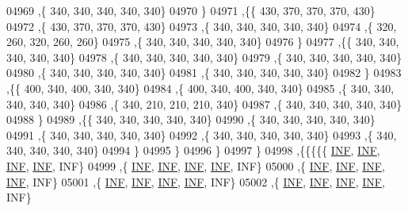 \begin{DoxyCode}
04969     ,\{   340,   340,   340,   340,   340\}
04970     \}
04971    ,\{\{   430,   370,   370,   370,   430\}
04972     ,\{   430,   370,   370,   370,   430\}
04973     ,\{   340,   340,   340,   340,   340\}
04974     ,\{   320,   260,   320,   260,   260\}
04975     ,\{   340,   340,   340,   340,   340\}
04976     \}
04977    ,\{\{   340,   340,   340,   340,   340\}
04978     ,\{   340,   340,   340,   340,   340\}
04979     ,\{   340,   340,   340,   340,   340\}
04980     ,\{   340,   340,   340,   340,   340\}
04981     ,\{   340,   340,   340,   340,   340\}
04982     \}
04983    ,\{\{   400,   340,   400,   340,   340\}
04984     ,\{   400,   340,   400,   340,   340\}
04985     ,\{   340,   340,   340,   340,   340\}
04986     ,\{   340,   210,   210,   210,   340\}
04987     ,\{   340,   340,   340,   340,   340\}
04988     \}
04989    ,\{\{   340,   340,   340,   340,   340\}
04990     ,\{   340,   340,   340,   340,   340\}
04991     ,\{   340,   340,   340,   340,   340\}
04992     ,\{   340,   340,   340,   340,   340\}
04993     ,\{   340,   340,   340,   340,   340\}
04994     \}
04995    \}
04996   \}
04997  \}
04998 ,\{\{\{\{\{   \hyperlink{constants_8h_a12c2040f25d8e3a7b9e1c2024c618cb6}{INF},   \hyperlink{constants_8h_a12c2040f25d8e3a7b9e1c2024c618cb6}{INF},   \hyperlink{constants_8h_a12c2040f25d8e3a7b9e1c2024c618cb6}{INF},   \hyperlink{constants_8h_a12c2040f25d8e3a7b9e1c2024c618cb6}{INF},   INF\}
04999     ,\{   \hyperlink{constants_8h_a12c2040f25d8e3a7b9e1c2024c618cb6}{INF},   \hyperlink{constants_8h_a12c2040f25d8e3a7b9e1c2024c618cb6}{INF},   \hyperlink{constants_8h_a12c2040f25d8e3a7b9e1c2024c618cb6}{INF},   \hyperlink{constants_8h_a12c2040f25d8e3a7b9e1c2024c618cb6}{INF},   INF\}
05000     ,\{   \hyperlink{constants_8h_a12c2040f25d8e3a7b9e1c2024c618cb6}{INF},   \hyperlink{constants_8h_a12c2040f25d8e3a7b9e1c2024c618cb6}{INF},   \hyperlink{constants_8h_a12c2040f25d8e3a7b9e1c2024c618cb6}{INF},   \hyperlink{constants_8h_a12c2040f25d8e3a7b9e1c2024c618cb6}{INF},   INF\}
05001     ,\{   \hyperlink{constants_8h_a12c2040f25d8e3a7b9e1c2024c618cb6}{INF},   \hyperlink{constants_8h_a12c2040f25d8e3a7b9e1c2024c618cb6}{INF},   \hyperlink{constants_8h_a12c2040f25d8e3a7b9e1c2024c618cb6}{INF},   \hyperlink{constants_8h_a12c2040f25d8e3a7b9e1c2024c618cb6}{INF},   INF\}
05002     ,\{   \hyperlink{constants_8h_a12c2040f25d8e3a7b9e1c2024c618cb6}{INF},   \hyperlink{constants_8h_a12c2040f25d8e3a7b9e1c2024c618cb6}{INF},   \hyperlink{constants_8h_a12c2040f25d8e3a7b9e1c2024c618cb6}{INF},   \hyperlink{constants_8h_a12c2040f25d8e3a7b9e1c2024c618cb6}{INF},   INF\}

\end{DoxyCode}
